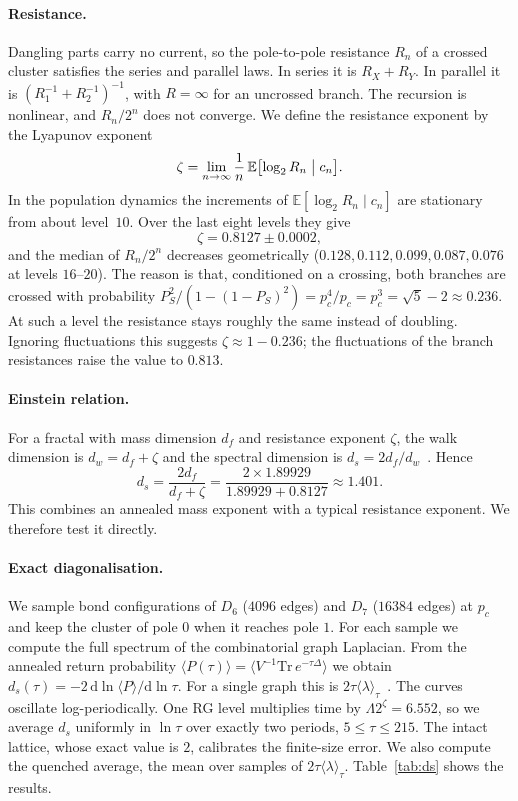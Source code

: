 \documentclass[11pt]{article}
\theoremstyle{remark}\newtheorem*{remark}{Remark}
\newcommand{\dd}{\mathrm{d}}
\newcommand{\EE}{\mathbb{E}}
\begin{document}
\paragraph{Resistance.} Dangling parts carry no current, so the pole-to-pole resistance $R_n$ of a crossed cluster
satisfies the series and parallel laws. In series it is $R_X+R_Y$. In parallel it is $(R_1^{-1}+R_2^{-1})^{-1}$, with
$R=\infty$ for an uncrossed branch. The recursion is nonlinear, and $R_n/2^n$ does not converge. We define the resistance
exponent by the Lyapunov exponent
\begin{equation}
\zeta=\lim_{n\to\infty}\frac1n\,\EE\bigl[\log_2R_n\bigm|c_n\bigr] .
\end{equation}
In the population dynamics the increments of $\EE[\log_2R_n\mid c_n]$ are stationary from about level~$10$. Over the last
eight levels they give
\begin{equation}
\zeta=0.8127\pm0.0002 ,
\end{equation}
and the median of $R_n/2^n$ decreases geometrically ($0.128,0.112,0.099,0.087,0.076$ at levels $16$--$20$). The reason is
that, conditioned on a crossing, both branches are crossed with probability
$P_S^2/(1-(1-P_S)^2)=p_c^4/p_c=p_c^3=\sqrt5-2\approx0.236$. At such a level the resistance stays roughly the same
instead of doubling. Ignoring fluctuations this suggests $\zeta\approx1-0.236$; the fluctuations of the branch
resistances raise the value to $0.813$.

\paragraph{Einstein relation.} For a fractal with mass dimension $d_f$ and resistance exponent $\zeta$, the walk dimension is
$d_w=d_f+\zeta$ and the spectral dimension is $d_s=2d_f/d_w$~\cite{AlexanderOrbach,BenAvrahamHavlin}. Hence
\begin{equation}
d_s=\frac{2d_f}{d_f+\zeta}=\frac{2\times1.89929}{1.89929+0.8127}\approx1.401 .
\label{eq:einstein}
\end{equation}
This combines an annealed mass exponent with a typical resistance exponent. We therefore test it directly.

\paragraph{Exact diagonalisation.} We sample bond configurations of $D_6$ ($4096$ edges) and $D_7$ ($16384$ edges) at $p_c$
and keep the cluster of pole $0$ when it reaches pole $1$. For each sample we compute the full spectrum of the
combinatorial graph Laplacian. From the annealed return probability
$\langle P(\tau)\rangle=\langle V^{-1}\mathrm{Tr}\,e^{-\tau\Delta}\rangle$ we obtain $d_s(\tau)=-2\,\dd\ln\langle P\rangle/\dd\ln\tau$. For a single
graph this is $2\tau\langle\lambda\rangle_\tau$~\cite{Chen2026_qgc}. The curves oscillate log-periodically. One RG level multiplies
time by $\Lambda2^\zeta=6.552$, so we average $d_s$ uniformly in $\ln\tau$ over exactly two periods, $5\le\tau\le215$. The intact
lattice, whose exact value is $2$, calibrates the finite-size error. We also compute the quenched average, the mean over
samples of $2\tau\langle\lambda\rangle_\tau$. Table~\ref{tab:ds} shows the results.
\end{document}
